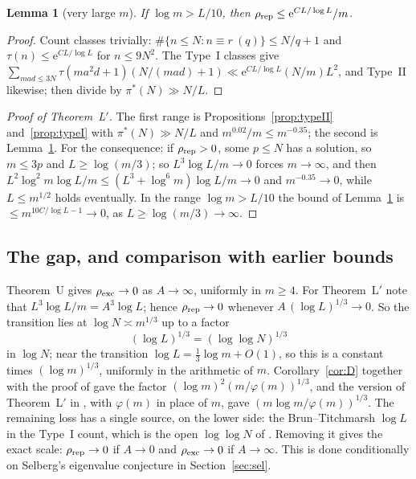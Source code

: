\documentclass[10pt,reqno]{amsart}
\newtheorem{lemma}[theorem]{Lemma}
\theoremstyle{definition}
\newcommand{\e}{\mathrm e}
\begin{document}
\begin{lemma}[very large $m$]\label{lem:hugem}
If $\log m>L/10$, then $\rho_{\rm rep}\leq\e^{CL/\log L}/m$.
\end{lemma}

\begin{proof}
Count classes trivially: $\#\{n\leq N:n\equiv r\ (q)\}\leq N/q+1$ and
$\tau(n)\leq\e^{CL/\log L}$ for $n\leq9N^2$.  The Type~I classes give
$\sum_{mad\leq3N}\tau(ma^2d+1)(N/(mad)+1)\ll\e^{CL/\log L}(N/m)L^2$, and
Type~II likewise; then divide by $\pi^*(N)\gg N/L$.
\end{proof}

\begin{proof}[Proof of Theorem~L$'$]
The first range is Propositions~\ref{prop:typeII} and~\ref{prop:typeI}
with $\pi^*(N)\gg N/L$ and $m^{0.02}/m\leq m^{-0.35}$; the second is
Lemma~\ref{lem:hugem}.  For the
consequence: if $\rho_{\rm rep}>0$, some $p\leq N$ has a solution, so
$m\leq3p$ and $L\geq\log(m/3)$; so $L^3\log L/m\to0$ forces
$m\to\infty$, and then
$L^2\log^2m\log L/m\leq(L^3+\log^6m)\log L/m\to0$ and
$m^{-0.35}\to0$, while $L\leq m^{1/2}$ holds eventually.  In the range
$\log m>L/10$ the bound of Lemma~\ref{lem:hugem} is
$\leq m^{10C/\log L-1}\to0$, as $L\geq\log(m/3)\to\infty$.
\end{proof}

\subsection{The gap, and comparison with earlier bounds}\label{sec:gap}
Theorem~U gives $\rho_{\rm exc}\to0$ as $A\to\infty$, uniformly in
$m\geq4$.  For Theorem~L$'$ note that $L^3\log L/m=A^3\log L$; hence
$\rho_{\rm rep}\to0$ whenever $A\,(\log L)^{1/3}\to0$.  So
the transition lies at $\log N\asymp m^{1/3}$ up to a factor
\[
 (\log L)^{1/3}=(\log\log N)^{1/3}
\]
in $\log N$; near the transition $\log L=\frac13\log m+O(1)$, so this is a
constant times $(\log m)^{1/3}$, uniformly in the arithmetic of $m$.
Corollary~\ref{cor:D} together with the
proof of \cite[Thm.~3.1]{PW} gave the factor
$(\log m)^2(m/\varphi(m))^{1/3}$, and the version of Theorem~L$'$ in
\cite{MN2}, with $\varphi(m)$ in place of $m$, gave
$(m\log m/\varphi(m))^{1/3}$.  The remaining loss has a single source, on
the lower side: the Brun--Titchmarsh $\log L$ in the Type~I count, which
is the open $\log\log N$ of \cite[Thm.~1.1]{ET}.  Removing it gives
the exact scale: $\rho_{\rm rep}\to0$ if $A\to0$ and $\rho_{\rm exc}\to0$
if $A\to\infty$.  This is done conditionally on Selberg's eigenvalue
conjecture in Section~\ref{sec:sel}.
\end{document}
